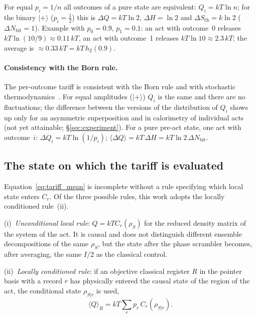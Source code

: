 \documentclass[11pt,a4paper]{article}
\newcommand{\Sref}[1]{\hyperref[#1]{\S\ref{#1}}}
\begin{document}
For equal $p_i=1/n$ all outcomes of a pure state are equivalent: $Q_i = kT\ln n$; for the binary $|{+}\rangle$ ($p_i=\tfrac12$) this is $\Delta Q = kT\ln 2$, $\Delta H=\ln 2$ and $\Delta S_{\mathrm{th}} = k\ln 2$ ($\Delta N_{\mathrm{bit}}=1$). Example with $p_0=0.9$, $p_1=0.1$: an act with outcome~0 releases $kT\ln(10/9)\approx 0.11\,kT$, an act with outcome~1 releases $kT\ln 10\approx 2.3\,kT$; the average is $\approx 0.33\,kT = kT\,h_2(0.9)$.

\paragraph{Consistency with the Born rule.}
The per-outcome tariff is consistent with the Born rule and with stochastic thermodynamics~\cite{sagawa2008}. For equal amplitudes ($|{+}\rangle$) $Q_i$ is the same and there are no fluctuations; the difference between the versions of the distribution of $Q_i$ shows up only for an asymmetric superposition and in calorimetry of individual acts (not yet attainable; \Sref{sec:experiment}). For a pure pre-act state, one act with outcome~$i$: $\Delta Q_i = kT\ln(1/p_i)$; $\langle\Delta Q\rangle = kT\,\Delta H = kT\ln 2\,\Delta N_{\mathrm{bit}}$.

\subsection{The state on which the tariff is evaluated}\label{sec:conditioning}

Equation~\eqref{eq:tariff_mean} is incomplete without a rule specifying which local state enters $C_r$. Of the three possible rules, this work adopts the locally conditioned rule~(ii).

(i)~\emph{Unconditional local rule}: $Q=kT C_r(\rho_S)$ for the reduced density matrix of the system of the act. It is causal and does not distinguish different ensemble decompositions of the same $\rho_S$, but the state after the phase scrambler becomes, after averaging, the same $I/2$ as the classical control.

(ii)~\emph{Locally conditioned rule}: if an objective classical register $R$ in the pointer basis with a record $r$ has physically entered the causal state of the region of the act, the conditional state $\rho_{S|r}$ is used,
\begin{equation}
\langle Q\rangle_R=kT\sum_r p_r\,C_r(\rho_{S|r}).
\label{eq:local_conditioned_tariff}
\end{equation}
\end{document}
